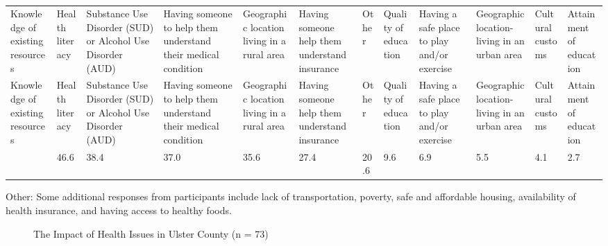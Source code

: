 \documentclass[
  english,
  letterpaper,
]{report}
\begin{document}
\begin{longtable}[]{@{}llllllllllll@{}}

\caption{\label{tbl-uc-achieve-health}Top Rated Barriers to Achieving
Better Health in Ulster County (n = 73)}

\tabularnewline

\caption{}\label{T_56171}\tabularnewline
\toprule\noalign{}
Knowledge of existing resources & Health literacy & Substance Use
Disorder (SUD) or Alcohol Use Disorder (AUD) & Having someone to help
them understand their medical condition & Geographic location living in
a rural area & Having someone help them understand insurance & Other &
Quality of education & Having a safe place to play and/or exercise &
Geographic location- living in an urban area & Cultural customs &
Attainment of education \\
\midrule\noalign{}
\endfirsthead
\toprule\noalign{}
Knowledge of existing resources & Health literacy & Substance Use
Disorder (SUD) or Alcohol Use Disorder (AUD) & Having someone to help
them understand their medical condition & Geographic location living in
a rural area & Having someone help them understand insurance & Other &
Quality of education & Having a safe place to play and/or exercise &
Geographic location- living in an urban area & Cultural customs &
Attainment of education \\
\midrule\noalign{}
\endhead
\bottomrule\noalign{}
\endlastfoot
65.8 & 46.6 & 38.4 & 37.0 & 35.6 & 27.4 & 20.6 & 9.6 & 6.9 & 5.5 & 4.1 &
2.7 \\

\end{longtable}

\begin{tcolorbox}[enhanced jigsaw, breakable, leftrule=.75mm, title=\textcolor{quarto-callout-note-color}{\faInfo}\hspace{0.5em}{Note}, bottomrule=.15mm, opacityback=0, left=2mm, colback=white, bottomtitle=1mm, coltitle=black, colbacktitle=quarto-callout-note-color!10!white, colframe=quarto-callout-note-color-frame, opacitybacktitle=0.6, toptitle=1mm, titlerule=0mm, arc=.35mm, rightrule=.15mm, toprule=.15mm]

Other: Some additional responses from participants include lack of
transportation, poverty, safe and affordable housing, availability of
health insurance, and having access to healthy foods.

\end{tcolorbox}

\begin{figure}


\caption{\label{fig-uc-impact-hlth-issue}The Impact of Health Issues in
Ulster County (n = 73)}

\end{figure}%
\end{document}
